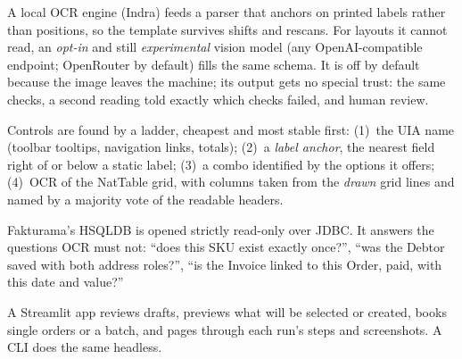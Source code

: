 \documentclass[11pt,a4paper]{article}
\begin{document}
\begin{description}[leftmargin=0pt,style=nextline]
  \item[Extraction.] A local OCR engine (Indra) feeds a parser that anchors on printed labels rather than positions, so the
        template survives shifts and rescans. For layouts it cannot read, an \emph{opt-in} and still \emph{experimental} vision model (any
        OpenAI-compatible endpoint; OpenRouter by default) fills the same schema. It is off by default because the image
        leaves the machine; its output gets no special trust: the same checks, a second reading told exactly which checks
        failed, and human review.
  \item[Control grounding.] Controls are found by a ladder, cheapest and most stable first: (1)~the UIA name (toolbar
        tooltips, navigation links, totals); (2)~a \emph{label anchor}, the nearest field right of or below a static label;
        (3)~a combo identified by the options it offers; (4)~OCR of the NatTable grid, with columns taken from the
        \emph{drawn} grid lines and named by a majority vote of the readable headers.
  \item[Decision and verification.] Fakturama's HSQLDB is opened strictly read-only over JDBC. It answers the questions
        OCR must not: ``does this SKU exist exactly once?'', ``was the Debtor saved with both address roles?'', ``is the
        Invoice linked to this Order, paid, with this date and value?''
  \item[Operation.] A Streamlit app reviews drafts, previews what will be selected or created, books single orders or a
        batch, and pages through each run's steps and screenshots. A CLI does the same headless.
\end{description}
\end{document}

